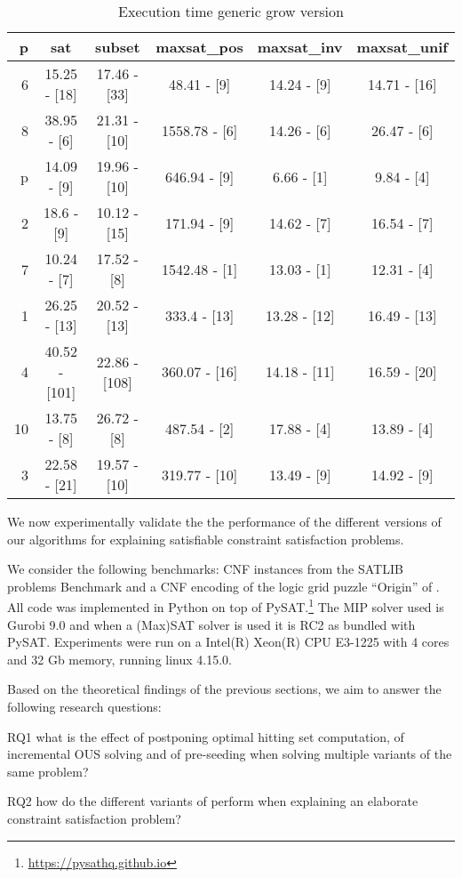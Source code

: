 
\begin{table*}
    \centering
    \caption{Execution time generic grow version}
    \begin{tabular}{|r||c|c|c|c|c|}
    \hline
      p &             sat &          subset &      maxsat\_pos &     maxsat\_inv &    maxsat\_unif \\
    \hline
     6 &  15.25 - [18]  &  17.46 - [33]  &  48.41 - [9]  &  14.24 - [9]  &  14.71 - [16]  \\
     8 &  38.95 - [6]  &  21.31 - [10]  &  1558.78 - [6]  &  14.26 - [6]  &  26.47 - [6]  \\
     p &  14.09 - [9]  &  19.96 - [10]  &  646.94 - [9]  &  6.66 - [1]  &  9.84 - [4]  \\
     2 &  18.6 - [9]  &  10.12 - [15]  &  171.94 - [9]  &  14.62 - [7]  &  16.54 - [7]  \\
     7 &  10.24 - [7]  &  17.52 - [8]  &  1542.48 - [1]  &  13.03 - [1]  &  12.31 - [4]  \\
     1 &  26.25 - [13]  &  20.52 - [13]  &  333.4 - [13]  &  13.28 - [12]  &  16.49 - [13]  \\
     4 &  40.52 - [101]  &  22.86 - [108]  &  360.07 - [16]  &  14.18 - [11]  &  16.59 - [20]  \\
     10 &  13.75 - [8]  &  26.72 - [8]  &  487.54 - [2]  &  17.88 - [4]  &  13.89 - [4]  \\
     3 &  22.58 - [21]  &  19.57 - [10]  &  319.77 - [10]  &  13.49 - [9]  &  14.92 - [9]  \\
    \hline
    \end{tabular}
\end{table*}


We now experimentally validate the the performance of the different versions of our algorithms for explaining satisfiable constraint satisfaction problems.

We consider the following benchmarks: CNF instances from the SATLIB problems Benchmark \cite{hoos2000satlib} and a CNF encoding of the logic grid puzzle ``Origin'' of \cite{ecai/BogaertsGCG20}. All code was implemented in Python on top of %
PySAT.\footnote{\url{https://pysathq.github.io}} The MIP solver used is Gurobi 9.0 and when a (Max)SAT solver is used it is RC2 as bundled with PySAT. Experiments were run on a Intel(R) Xeon(R) CPU E3-1225 with 4 cores and 32 Gb memory, running linux 4.15.0.

Based on the theoretical findings of the previous sections, we aim to answer the following research questions:
\begin{compactdesc}
\item[RQ1] what is the effect of postponing optimal hitting set computation, of incremental OUS solving and of pre-seeding \satsets when solving multiple variants of the same problem?
\item[RQ2] how do the different variants of \omus perform when explaining an elaborate constraint satisfaction problem?
\end{compactdesc}


